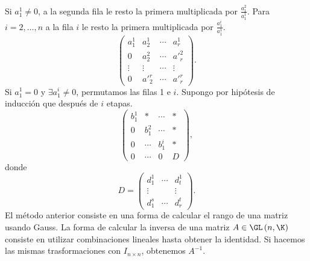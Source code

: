 Si $\displaystyle a^{1}_{1} \neq 0 $, a la segunda fila le resto la primera multiplicada por $\displaystyle \frac{a^{2}_{1}}{a^{1}_{1}} $. Para $\displaystyle i = 2, \ldots, n $ a la fila $\displaystyle i $  le resto la primera multiplicada por $\displaystyle \frac{a^{i}_{1}}{a^{1}_{1}} $. 
\[\begin{pmatrix} a^{1}_{1} & a^{1}_{2} & \cdots & a^{1}_{r} \\
0 & a^{2}_{2} & \cdots & a'^{2}_{r} \\
\vdots & \vdots & \cdots & \vdots \\
0 & a'^{r}_{2} & \cdots & a'^{r}_{r}\end{pmatrix} .\]
Si $\displaystyle a^{1}_{1} = 0 $ y $\displaystyle \exists a^{i}_{1} \neq 0 $, permutamos las filas 1 e $\displaystyle i $. Supongo por hipótesis de inducción que después de $\displaystyle i $ etapas. 
	\[\begin{pmatrix} b^{1}_{1} & * & \cdots & * \\
	0 & b^{2}_{1} & \cdots & * \\
0 & \cdots & b^{i}_{1} & * \\
0 & \cdots & 0 & D\end{pmatrix} ,\]
donde
		\[D = \begin{pmatrix} d^{1}_{1} & \cdots & d^{1}_{t} \\
		\vdots & & \vdots \\
	d^{s}_{1} & \cdots & d^{t}_{r}\end{pmatrix} .\]
El método anterior consiste en una forma de calcular el rango de una matriz usando Gauss. La forma de calcular la inversa de una matriz $\displaystyle A \in \GL\left(n, \K\right) $ consiste en utilizar combinaciones lineales hasta obtener la identidad. Si hacemos las mismas trasformaciones con $\displaystyle I_{n \times n} $, obtenemos $\displaystyle A^{-1} $.
